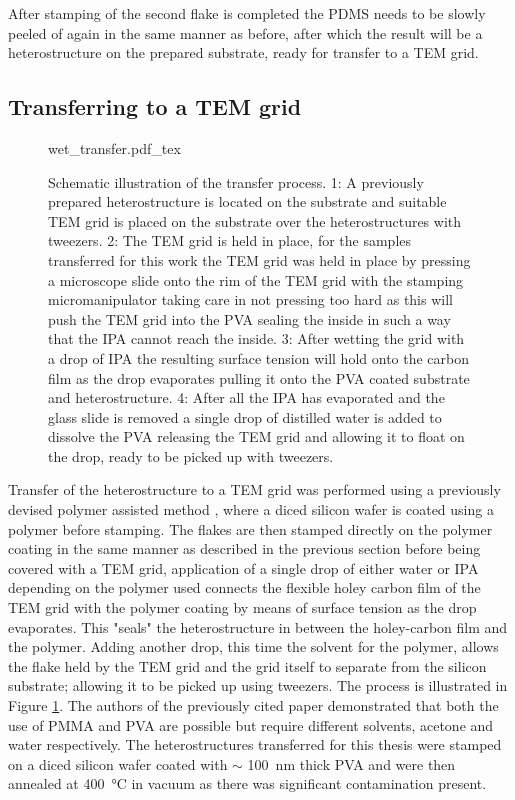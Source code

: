 After stamping of the second flake is completed the PDMS needs to be slowly peeled of again in the same manner as before, after which the result will be a heterostructure on the prepared substrate, ready for transfer to a TEM grid.

\subsection{Transferring to a TEM grid}
\begin{figure}[h]
	\centering
	\def\svgwidth{1\linewidth}
	{wet_transfer.pdf_tex}
	\caption{Schematic illustration of the transfer process. 1: A previously prepared heterostructure is located on the substrate and suitable TEM grid is placed on the substrate over the heterostructures with tweezers. 2: The TEM grid is held in place, for the samples transferred for this work the TEM grid was held in place by pressing a microscope slide onto the rim of the TEM grid with the stamping micromanipulator taking care in not pressing too hard as this will push the TEM grid into the PVA sealing the inside in such a way that the IPA cannot reach the inside. 3: After wetting the grid with a drop of IPA the resulting surface tension will hold onto the carbon film as the drop evaporates pulling it onto the PVA coated substrate and heterostructure. 4: After all the IPA has evaporated and the glass slide is removed a single drop of distilled water is added to dissolve the PVA releasing the TEM grid and allowing it to float on the drop, ready to be picked up with tweezers.}
	\label{fig:wet_transfer}
\end{figure}

Transfer of the heterostructure to a TEM grid was performed using a previously devised polymer assisted method \cite{kosterPolymerassistedTEMSpecimen2021}, where a diced silicon wafer is coated using a polymer before stamping.
The flakes are then stamped directly on the polymer coating in the same manner as described in the previous section before being covered with a TEM grid, application of a single drop of either water or IPA  depending on the polymer used connects the flexible holey carbon film of the TEM grid with the polymer coating by means of surface tension as the drop evaporates. This "seals" the heterostructure in between the holey-carbon film and the polymer.
Adding another drop, this time the solvent for the polymer, allows the flake held by the TEM grid and the grid itself to separate from the silicon substrate; allowing it to be picked up using tweezers.
The process is illustrated in Figure \ref{fig:wet_transfer}.
The authors of the previously cited paper demonstrated that both the use of PMMA and PVA are possible but require different solvents, acetone and water respectively.
The heterostructures transferred for this thesis were stamped on a diced silicon wafer coated with \(\sim \) \SI{100}{\nm} thick PVA and were then annealed at \SI{400}{\degreeCelsius} in vacuum as there was significant contamination present.
